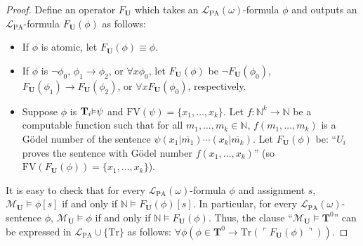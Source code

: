 \documentclass[reqno]{article}
\theoremstyle{definition}
\def\L{\mathscr{L}}
\def\M{\mathscr{M}}
\def\T{\mathbf{T}}
\def\U{\mathbf{U}}
\def\FV{\mathrm{FV}}
\def\LPA{\L_{\mathrm{PA}}}
\def\Tr{\mathrm{Tr}}
\renewcommand{\Pr}[1]{\T_{#1}\mbox{\small${\vDash}$}}
\begin{document}
\begin{proof}
Define an operator $F_\U$ which takes an $\LPA(\omega)$-formula $\phi$ and outputs
an $\LPA$-formula $F_\U(\phi)$ as follows:
\begin{itemize}
    \item
    If $\phi$ is atomic, let $F_\U(\phi)\equiv \phi$.
    \item
    If $\phi$ is $\neg\phi_0$, $\phi_1\rightarrow\phi_2$,
    or $\forall x\phi_0$, let $F_\U(\phi)$
    be $\neg F_\U(\phi_0)$, $F_\U(\phi_1)\rightarrow F_\U(\phi_2)$,
    or $\forall x F_\U(\phi_0)$, respectively.
    \item
    Suppose $\phi$ is $\Pr i \psi$ and $\FV(\psi)=\{x_1,\ldots,x_k\}$.
    Let $f:\mathbb N^k\to\mathbb N$ be a computable function such that
    for all $m_1,\ldots,m_k\in\mathbb N$,
    $f(m_1,\ldots,m_k)$ is a G\"odel number of
    the sentence $\psi(x_1|\overline{m_1})\cdots (x_k|\overline{m_k})$.
    Let $F_\U(\phi)$ be: ``$U_i$ proves
    the sentence with G\"odel number $f(x_1,\ldots,x_k)$''
    (so $\FV(F_\U(\phi))=\{x_1,\ldots,x_k\}$).
\end{itemize}
It is easy to check that for every $\LPA(\omega)$-formula $\phi$ and assignment $s$,
$\M_\U\models\phi[s]$ if and only if $\mathbb N\models F_\U(\phi)[s]$.
In particular, for every $\LPA(\omega)$-sentence $\phi$, $\M_\U\models\phi$
if and only if $\mathbb N\models F_\U(\phi)$. Thus,
the clause ``$\M_\U\models \T^0$'' can be expressed
in $\LPA\cup\{\Tr\}$ as follows:
$\forall \phi(\phi\in \T^0\rightarrow \Tr(\ulcorner F_\U(\phi)\urcorner))$.
\end{proof}
\end{document}

